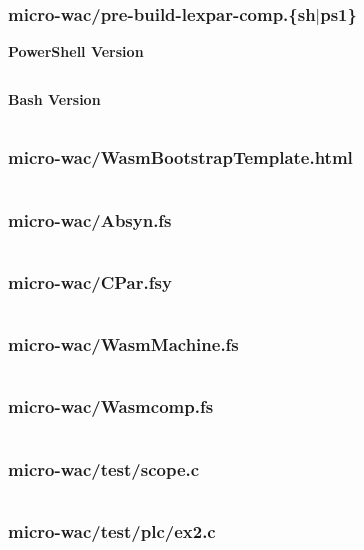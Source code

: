 \documentclass[a4paper]{article}
\begin{document}
\subsubsection{micro-wac/pre-build-lexpar-comp.\{sh$|$ps1\}}
\label{sec:appendix:code:pre-build-lexpar-comp}
\textbf{PowerShell Version}
\inputminted[breaklines,tabsize=2,linenos]{powershell}{../micro-wac/pre-build-lexpar-comp.ps1}

\newpage
\noindent\textbf{Bash Version}
\inputminted[breaklines,tabsize=2,linenos]{bash}{../micro-wac/pre-build-lexpar-comp.sh}

\newpage
\subsubsection{micro-wac/WasmBootstrapTemplate.html}
\label{sec:appendix:code:bootstrap-template}
\inputminted[breaklines,tabsize=2,linenos]{html}{../micro-wac/WasmBootstrapTemplate.html}

\newpage
\subsubsection{micro-wac/Absyn.fs}
\label{sec:appendix:code:Absyn.fs}
\inputminted[breaklines,tabsize=2,linenos]{fsharp}{../micro-wac/Absyn.fs}

\newpage
\subsubsection{micro-wac/CPar.fsy}
\label{sec:appendix:code:CPar.fsy}
\inputminted[breaklines,tabsize=2,linenos]{fsharp}{../micro-wac/CPar.fsy}

\newpage
\subsubsection{micro-wac/WasmMachine.fs}
\label{sec:appendix:code:WasmMachine.fs}
\inputminted[breaklines,tabsize=2,linenos]{fsharp}{../micro-wac/WasmMachine.fs}

\newpage
\subsubsection{micro-wac/Wasmcomp.fs}
\label{sec:appendix:code:Wasmcomp.fs}
\inputminted[breaklines,tabsize=2,linenos]{fsharp}{../micro-wac/Wasmcomp.fs}

\newpage
\subsubsection{micro-wac/test/scope.c}
\label{sec:appendix:code:test-scope.c}
\inputminted[breaklines,tabsize=2,linenos]{c}{../micro-wac/test/scope.c}

\newpage
\subsubsection{micro-wac/test/plc/ex2.c}
\label{sec:appendix:code:plc-ex2.c}
\inputminted[breaklines,tabsize=2,linenos]{c}{../micro-wac/test/plc/ex2.c}
\end{document}
